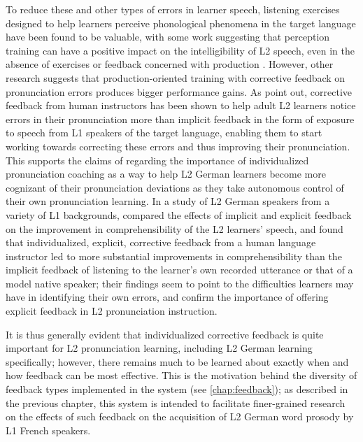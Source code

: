 To reduce these and other types of errors in learner speech,
listening exercises designed to help 
learners perceive phonological phenomena in the target language
have been found to be valuable, with some work suggesting that perception training can have a positive impact on the intelligibility of L2 speech, even in the absence of exercises or feedback concerned with production \citep{Derwing2005,Hirschfeld2007}.
%
However, 
other research suggests that production-oriented training with corrective feedback on pronunciation errors produces bigger performance gains. %
%
%
As \textcite{Neri2002} point out, corrective feedback from human instructors has been shown to help adult L2 learners notice errors in their pronunciation more than implicit feedback in the form of exposure to speech from L1 speakers of the target language, enabling them to start working towards correcting these errors and thus improving their pronunciation.
This supports the claims of \textcite{Mehlhorn2005} regarding the importance of individualized pronunciation coaching as a way to help L2 German learners become more cognizant of their pronunciation deviations as they take autonomous control of their own pronunciation learning.
%
In a study of L2 German speakers from a variety of L1 backgrounds, \textcite{Dlaska2013} compared the effects of implicit and explicit feedback on the improvement in comprehensibility of the L2 learners' speech, and found that individualized, explicit, corrective feedback from a human language instructor led to more substantial improvements in comprehensibility than the implicit feedback of listening to the learner's own recorded utterance or that of a model native speaker; their findings seem to point to the difficulties learners may have in identifying their own errors, and confirm the importance of offering explicit feedback in L2 pronunciation instruction. 
%

It is thus generally evident that individualized corrective feedback is quite important for L2 pronunciation learning, including L2 German learning specifically; however, there remains much to be learned about exactly when and how feedback can be most effective. This is the motivation behind the 
diversity of feedback types implemented in the  
system (see \cref{chap:feedback}); as described in the previous chapter, this system is intended to facilitate finer-grained research on the effects of such feedback on the acquisition of L2 German word prosody by L1 French speakers.








